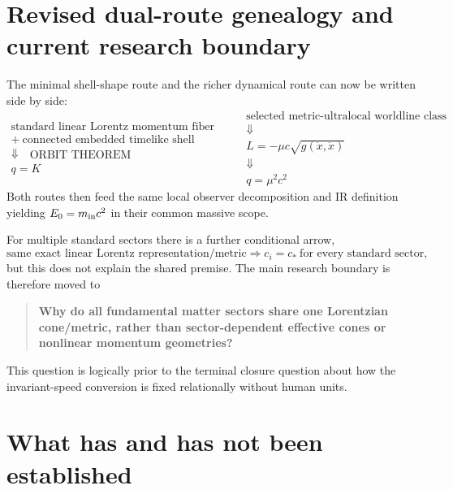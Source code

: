 \documentclass[11pt,a4paper]{article}
\begin{document}
\section{Revised dual-route genealogy and current research boundary}
The minimal shell-shape route and the richer dynamical route can now be written side by side:
\begin{equation}
\boxed{\begin{gathered}
\text{standard linear Lorentz momentum fiber}\\
+\ \text{connected embedded timelike shell}\\
\Downarrow\quad\text{ORBIT THEOREM}\\
q=K
\end{gathered}}
\qquad
\boxed{\begin{gathered}
\text{selected metric-ultralocal worldline class}\\
\Downarrow\\
L=-\mu c\sqrt{g(\dot x,\dot x)}\\
\Downarrow\\
q=\mu^2c^2
\end{gathered}}
\end{equation}
Both routes then feed the same local observer decomposition and IR definition yielding $E_0=m_{\rm in}c^2$ in their common massive scope.

For multiple standard sectors there is a further conditional arrow,
\begin{equation}
\boxed{\text{same exact linear Lorentz representation/metric}}
\Longrightarrow
\boxed{c_i=c_*\ \text{for every standard sector}},
\end{equation}
but this does not explain the shared premise.  The main research boundary is therefore moved to
\begin{quote}
\textbf{Why do all fundamental matter sectors share one Lorentzian cone/metric, rather than sector-dependent effective cones or nonlinear momentum geometries?}
\end{quote}
This question is logically prior to the terminal closure question about how the invariant-speed conversion is fixed relationally without human units.


\section{What has and has not been established}
\end{document}
